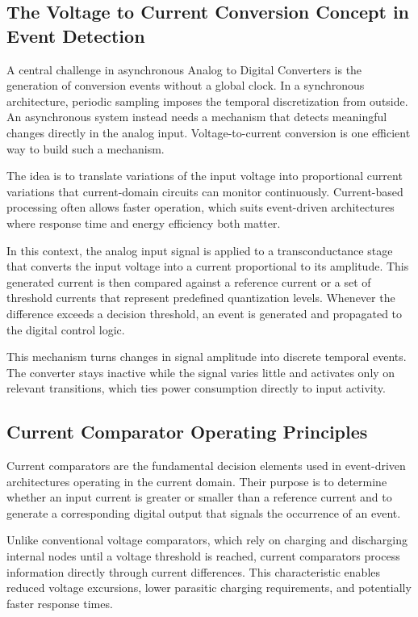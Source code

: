 \subsection{The Voltage to Current Conversion Concept in Event Detection}

A central challenge in asynchronous Analog to Digital Converters is the generation of conversion events without a global clock. In a synchronous architecture, periodic sampling imposes the temporal discretization from outside. An asynchronous system instead needs a mechanism that detects meaningful changes directly in the analog input. Voltage-to-current conversion is one efficient way to build such a mechanism.

The idea is to translate variations of the input voltage into proportional current variations that current-domain circuits can monitor continuously. Current-based processing often allows faster operation, which suits event-driven architectures where response time and energy efficiency both matter.

In this context, the analog input signal is applied to a transconductance stage that converts the input voltage into a current proportional to its amplitude. This generated current is then compared against a reference current or a set of threshold currents that represent predefined quantization levels. Whenever the difference exceeds a decision threshold, an event is generated and propagated to the digital control logic.

This mechanism turns changes in signal amplitude into discrete temporal events. The converter stays inactive while the signal varies little and activates only on relevant transitions, which ties power consumption directly to input activity.

\subsection{Current Comparator Operating Principles}

Current comparators are the fundamental decision elements used in event-driven architectures operating in the current domain. Their purpose is to determine whether an input current is greater or smaller than a reference current and to generate a corresponding digital output that signals the occurrence of an event.

Unlike conventional voltage comparators, which rely on charging and discharging internal nodes until a voltage threshold is reached, current comparators process information directly through current differences. This characteristic enables reduced voltage excursions, lower parasitic charging requirements, and potentially faster response times.

